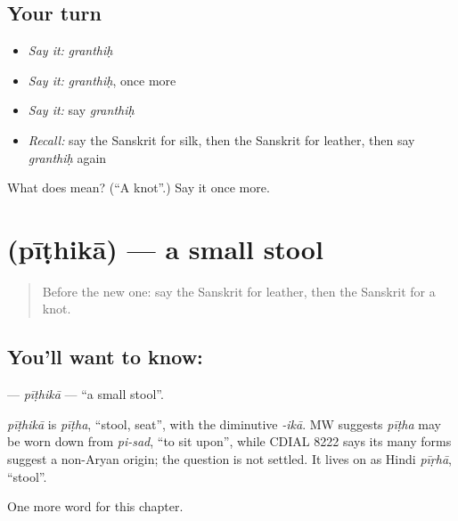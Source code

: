 \subsection*{Your turn}
\begin{itemize}
\raggedright
  \item \emph{Say it:} \emph{granthiḥ}
  \item \emph{Say it:} \emph{granthiḥ}, once more
  \item \emph{Say it:} say \emph{granthiḥ}
  \item \emph{Recall:} say the Sanskrit for silk, then the Sanskrit for leather, then say \emph{granthiḥ} again
\end{itemize}

\begin{tcolorbox}[breakable,colback=teal!4,colframe=teal!35!black,title={Before you move on}]
What does  mean? (\textquotedblleft{}A knot\textquotedblright{}.) Say it once more.
\end{tcolorbox}
\section[\texorpdfstring{\sk{पीठिका} (pīṭhikā)}{पीठिका (pīṭhikā)}]{ (pīṭhikā) — a small stool}

\label{lesson:SA-C221-pithika}



\begin{quote}
Before the new one: say the Sanskrit for leather, then the Sanskrit for a knot.
\end{quote}

\subsection*{You'll want to know: }
\textbf{} — \emph{pīṭhikā} — \textquotedblleft{}a small stool\textquotedblright{}.

\begin{cousinweb}
\emph{pīṭhikā} is \emph{pīṭha}, \textquotedblleft{}stool, seat\textquotedblright{}, with the diminutive \emph{-ikā}. MW suggests \emph{pīṭha} may be worn down from \emph{pi-sad}, \textquotedblleft{}to sit upon\textquotedblright{}, while CDIAL 8222 says its many forms suggest a non-Aryan origin; the question is not settled. It lives on as Hindi \emph{pīṛhā}, \textquotedblleft{}stool\textquotedblright{}.
\end{cousinweb}

\begin{grammarlens}[title={What you've built}]
One more word for this chapter.
\end{grammarlens}

